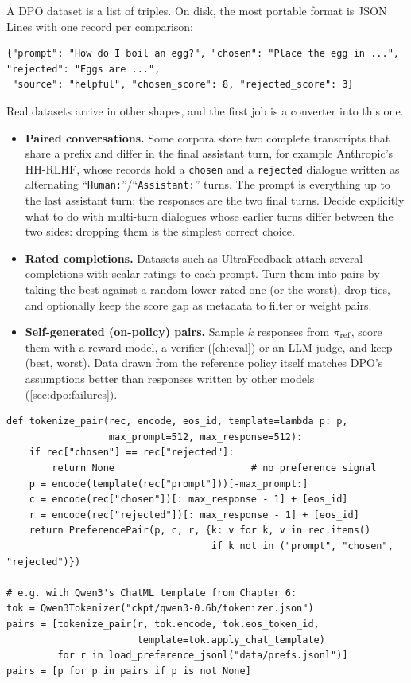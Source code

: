 A DPO dataset is a list of triples. On disk, the most portable format is JSON Lines with one
record per comparison:
\begin{lstlisting}[style=plain]
{"prompt": "How do I boil an egg?", "chosen": "Place the egg in ...", "rejected": "Eggs are ...",
 "source": "helpful", "chosen_score": 8, "rejected_score": 3}
\end{lstlisting}
Real datasets arrive in other shapes, and the first job is a converter into this one.
\begin{itemize}
\item \textbf{Paired conversations.} Some corpora store two complete transcripts that share a
  prefix and differ in the final assistant turn, for example Anthropic's HH-RLHF, whose records hold a
  \texttt{chosen} and a \texttt{rejected} dialogue written as alternating
  ``\texttt{Human:}''/``\texttt{Assistant:}'' turns. The prompt is everything up to the last assistant
  turn; the responses are the two final turns. Decide explicitly what to do with multi-turn
  dialogues whose earlier turns differ between the two sides: dropping them is the simplest correct
  choice.
\item \textbf{Rated completions.} Datasets such as UltraFeedback attach several completions with
  scalar ratings to each prompt. Turn them into pairs by taking the best against a random
  lower-rated one (or the worst), drop ties, and optionally keep the score gap as metadata to filter
  or weight pairs.
\item \textbf{Self-generated (on-policy) pairs.} Sample $k$ responses from $\pi_{\text{ref}}$, score them with
  a reward model, a verifier (\cref{ch:eval}) or an LLM judge, and keep (best, worst). Data drawn
  from the reference policy itself matches DPO's assumptions better than responses written by other
  models (\cref{sec:dpo:failures}).
\end{itemize}

\begin{lstlisting}[caption={Loading JSONL pairs and tokenising them with a chat template. Prompts are truncated from the left (keep the latest turns), responses from the right; EOS is appended to both responses.},label={lst:dpo:tokenize}]
def tokenize_pair(rec, encode, eos_id, template=lambda p: p,
                  max_prompt=512, max_response=512):
    if rec["chosen"] == rec["rejected"]:
        return None                        # no preference signal
    p = encode(template(rec["prompt"]))[-max_prompt:]
    c = encode(rec["chosen"])[: max_response - 1] + [eos_id]
    r = encode(rec["rejected"])[: max_response - 1] + [eos_id]
    return PreferencePair(p, c, r, {k: v for k, v in rec.items()
                                    if k not in ("prompt", "chosen", "rejected")})

# e.g. with Qwen3's ChatML template from Chapter 6:
tok = Qwen3Tokenizer("ckpt/qwen3-0.6b/tokenizer.json")
pairs = [tokenize_pair(r, tok.encode, tok.eos_token_id,
                       template=tok.apply_chat_template)
         for r in load_preference_jsonl("data/prefs.jsonl")]
pairs = [p for p in pairs if p is not None]
\end{lstlisting}


